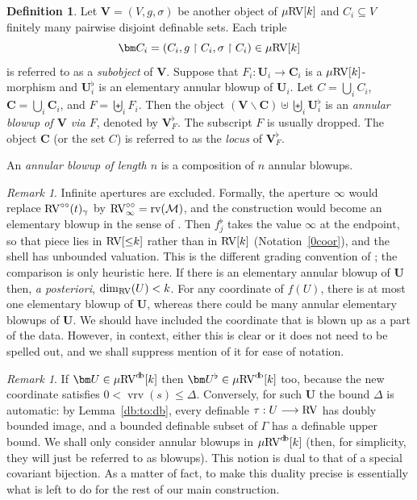 \documentclass[12pt]{amsart}
\newcommand{\memph}[1]{{\color{magenta}\emph{#1}}}
\theoremstyle{plain}
\theoremstyle{definition}
\newtheorem{defn}[thm]{Definition}
\theoremstyle{remark}
\newtheorem{rem}[thm]{Remark}
\numberwithin{equation}{section}
\theoremstyle{plain}
\newcommand{\RV}{\textup{RV}}
\newcommand{\MM}{\mdl M}
\newcommand{\0}{\emptyset}
\newcommand{\mdl}[1]{\mathcal{#1}}  %
\newcommand{\rest}{\upharpoonright}
\newcommand{\fun}{\longrightarrow}
\newcommand{\sub}{\subseteq}
\newcommand{\mi}{\smallsetminus}
\newcommand{\mRV}{{\mu}{\RV}}
\DeclareMathOperator{\rv}{rv}
\DeclareMathOperator{\vrv}{vrv}
\DeclareMathOperator{\db}{d \! b}
\newcommand{\ccirc}{\circ \circ}
\begin{document}
\begin{defn}
Let $\bm V = (V, g, \sigma)$ be another object of $\mRV[k]$ and $C_i \sub V$ finitely many pairwise disjoint definable sets. Each triple
\[
\bm C_i = (C_i, g \rest C_i, \sigma \rest C_i) \in \mRV[k]
\]
is referred to as a \memph{subobject} of $\bm V$. Suppose that $F_i : \bm U_i \fun \bm C_i$ is a $\mRV[k]$-morphism and $\bm U^{\flat}_i$ is an elementary annular blowup of $\bm U_i$. Let $C = \bigcup_i C_i$, $\bm C = \bigcup_i \bm C_i$,  and $F = \biguplus_i F_i$. Then the object
$
 (\bm V \mi \bm C) \uplus \biguplus_i \bm U_i^{\flat}
$
is  an \memph{annular blowup of $\bm V$ via $F$}, denoted by $\bm V^{\flat}_F$. The subscript $F$ is usually dropped. The object $\bm C$ (or the set $C$) is referred to as the \memph{locus} of $\bm V^{\flat}_F$.

An \memph{annular blowup of length $n$} is a composition of $n$ annular blowups.
\end{defn}

\begin{rem}
Infinite apertures are excluded. Formally, the aperture $\infty$ would replace $\RV^{\ccirc}(t)_\gamma$ by $\RV^{\ccirc}_\infty = \rv(\MM)$, and the construction would become an elementary blowup in the sense of \cite[Definition~6.1]{Yin:int:acvf}. Then $f^\flat_j$ takes the value $\infty$ at the endpoint, so that piece lies in $\RV[{\leq}k]$ rather than in $\RV[k]$ (Notation~\ref{0coor}), and the shell has unbounded valuation. This is the different grading convention of \cite{Yin:int:acvf}; the comparison is only heuristic here. If there is an elementary annular blowup of $\bm U$ then, \textit{a posteriori}, $\dim_{\RV}(U) < k$. For any coordinate of $f(U)$, there is at most one elementary blowup of $\bm U$, whereas there could be many annular elementary blowups of $\bm U$. We should have included the coordinate that is blown up as a part of the data. However, in context, either this is
clear or it does not need to be spelled out, and we shall suppress mention of it for ease of notation.
\end{rem}

\begin{rem}
\label{db:blowup:bound}If $\bm U \in \mRV^{\db}[k]$ then $\bm U^{\flat} \in \mRV^{\db}[k]$ too, because the new coordinate satisfies $0 < \vrv(s) \leq \Delta$. Conversely, for such $\bm U$ the bound $\Delta$ is automatic: by Lemma~\ref{db:to:db}, every definable $\tau : U \fun \RV$ has doubly bounded image, and a bounded definable subset of $\Gamma$ has a definable upper bound. We shall only consider annular blowups  in $\mRV^{\db}[k]$ (then, for simplicity, they will just be referred to as blowups). This notion is dual to that of a  special covariant bijection. As a matter of fact, to make this duality precise is essentially what is left to do for the rest of our main construction.
\end{rem}
\end{document}
